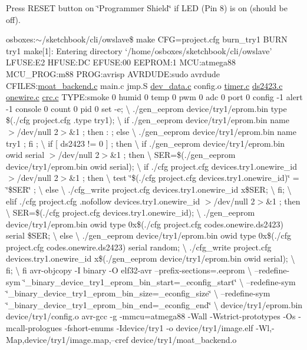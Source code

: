 Press R\-E\-S\-E\-T button on \char`\"{}\-Programmer Shield\char`\"{} if L\-E\-D (Pin 8) is on (should be off).

osboxes\-:$\sim$/sketchbook/cli/owslave\$ make C\-F\-G=project.\-cfg burn\-\_\-try1 B\-U\-R\-N try1 make\mbox{[}1\mbox{]}\-: Entering directory `/home/osboxes/sketchbook/cli/owslave' L\-F\-U\-S\-E\-:E2 H\-F\-U\-S\-E\-:D\-C E\-F\-U\-S\-E\-:00 E\-E\-P\-R\-O\-M\-:1 M\-C\-U\-:atmega88 M\-C\-U\-\_\-\-P\-R\-O\-G\-:m88 P\-R\-O\-G\-:avrisp A\-V\-R\-D\-U\-D\-E\-:sudo avrdude C\-F\-I\-L\-E\-S\-:\hyperlink{moat__backend_8c}{moat\-\_\-backend.\-c} main.\-c jmp.\-S \hyperlink{dev__data_8c}{dev\-\_\-data.\-c} config.\-o \hyperlink{timer_8c}{timer.\-c} \hyperlink{ds2423_8c}{ds2423.\-c} \hyperlink{onewire_8c}{onewire.\-c} \hyperlink{crc_8c}{crc.\-c} T\-Y\-P\-E\-:smoke 0 humid 0 temp 0 pwm 0 adc 0 port 0 config -\/1 alert -\/1 console 0 count 0 pid 0 set -\/e; \textbackslash{} ./gen\-\_\-eeprom device/try1/eprom.\-bin type \$(./cfg project.\-cfg .type try1); \textbackslash{} if ./gen\-\_\-eeprom device/try1/eprom.\-bin name $>$/dev/null 2$>$\&1 ; then \-: ; else \textbackslash{} ./gen\-\_\-eeprom device/try1/eprom.\-bin name try1 ; fi ; \textbackslash{} if \mbox{[} ds2423 != 0 \mbox{]} ; then \textbackslash{} if ./gen\-\_\-eeprom device/try1/eprom.\-bin owid serial $>$/dev/null 2$>$\&1 ; then \textbackslash{} S\-E\-R=\$(./gen\-\_\-eeprom device/try1/eprom.\-bin owid serial); \textbackslash{} if ./cfg project.\-cfg devices.\-try1.\-onewire\-\_\-id $>$/dev/null 2$>$\&1 ; then \textbackslash{} test \char`\"{}\$(./cfg project.\-cfg devices.\-try1.\-onewire\-\_\-id)\char`\"{} = \char`\"{}\$\-S\-E\-R\char`\"{} ; \textbackslash{} else \textbackslash{} ./cfg\-\_\-write project.\-cfg devices.\-try1.\-onewire\-\_\-id x\$\-S\-E\-R; \textbackslash{} fi; \textbackslash{} elif ./cfg project.\-cfg .nofollow devices.\-try1.\-onewire\-\_\-id $>$/dev/null 2$>$\&1 ; then \textbackslash{} S\-E\-R=\$(./cfg project.\-cfg devices.\-try1.\-onewire\-\_\-id); \textbackslash{} ./gen\-\_\-eeprom device/try1/eprom.\-bin owid type 0x\$(./cfg project.\-cfg codes.\-onewire.\-ds2423) serial \$\-S\-E\-R; \textbackslash{} else \textbackslash{} ./gen\-\_\-eeprom device/try1/eprom.\-bin owid type 0x\$(./cfg project.\-cfg codes.\-onewire.\-ds2423) serial random; \textbackslash{} ./cfg\-\_\-write project.\-cfg devices.\-try1.\-onewire\-\_\-id x\$(./gen\-\_\-eeprom device/try1/eprom.\-bin owid serial); \textbackslash{} fi; \textbackslash{} fi avr-\/objcopy -\/\-I binary -\/\-O elf32-\/avr --prefix-\/sections=.eeprom \textbackslash{} --redefine-\/sym \char`\"{}\-\_\-binary\-\_\-device\-\_\-try1\-\_\-eprom\-\_\-bin\-\_\-start=\-\_\-econfig\-\_\-start\char`\"{} \textbackslash{} --redefine-\/sym \char`\"{}\-\_\-binary\-\_\-device\-\_\-try1\-\_\-eprom\-\_\-bin\-\_\-size=\-\_\-econfig\-\_\-size\char`\"{} \textbackslash{} --redefine-\/sym \char`\"{}\-\_\-binary\-\_\-device\-\_\-try1\-\_\-eprom\-\_\-bin\-\_\-end=\-\_\-econfig\-\_\-end\char`\"{} \textbackslash{} device/try1/eprom.\-bin device/try1/config.\-o avr-\/gcc -\/g -\/mmcu=atmega88 -\/\-Wall -\/\-Wstrict-\/prototypes -\/\-Os -\/mcall-\/prologues -\/fshort-\/enums -\/\-Idevice/try1 -\/o device/try1/image.\-elf -\/\-Wl,-\/\-Map,device/try1/image.\-map,--cref device/try1/moat\-\_\-backend.\-o 